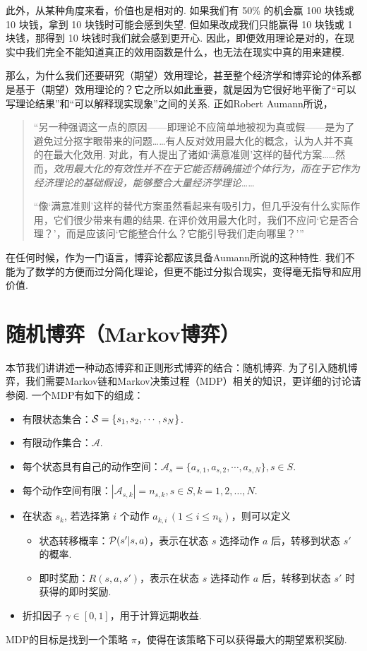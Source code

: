 此外，从某种角度来看，价值也是相对的. 如果我们有 50\% 的机会赢 100 块钱或 10 块钱，拿到 10 块钱时可能会感到失望. 但如果改成我们只能赢得 10 块钱或 1 块钱，那得到 10 块钱时我们就会感到更开心. 因此，即便效用理论是对的，在现实中我们完全不能知道真正的效用函数是什么，也无法在现实中真的用来建模.

那么，为什么我们还要研究（期望）效用理论，甚至整个经济学和博弈论的体系都是基于（期望）效用理论的？它之所以如此重要，就是因为它很好地平衡了“可以写理论结果”和“可以解释现实现象”之间的关系. 正如Robert Aumann所说，

\begin{quotation}
    “另一种强调这一点的原因——即理论不应简单地被视为真或假——是为了避免过分抠字眼带来的问题……有人反对效用最大化的概念，认为人并不真的在最大化效用. 对此，有人提出了诸如‘满意准则’这样的替代方案……然而，\textit{效用最大化的有效性并不在于它能否精确描述个体行为，而在于它作为经济理论的基础假设，能够整合大量经济学理论}……

    “像‘满意准则’这样的替代方案虽然看起来有吸引力，但几乎没有什么实际作用，它们很少带来有趣的结果. 在评价效用最大化时，我们不应问‘它是否合理？’，而是应该问‘它能整合什么？它能引导我们走向哪里？’”
\end{quotation}

在任何时候，作为一门语言，博弈论都应该具备Aumann所说的这种特性. 我们不能为了数学的方便而过分简化理论，但更不能过分拟合现实，变得毫无指导和应用价值.

\section{随机博弈（Markov博弈）}\label{sec:stochastic-game}

本节我们讲讲述一种动态博弈和正则形式博弈的结合：随机博弈. 为了引入随机博弈，我们需要Markov链和Markov决策过程（MDP）相关的知识，更详细的讨论请参阅. 一个MDP有如下的组成：
\begin{itemize}
\item 有限状态集合：$\mathcal S=\{s_1,s_2,\cdots,s_N\}$.
\item 有限动作集合：$\mathcal A$.
\item 每个状态具有自己的动作空间：$\mathcal A_s = \{a_{s,1},a_{s,2},\cdots, a_{s,N}\}, s\in S$.
\item 每个动作空间有限：$|\mathcal A_{s,k}|=n_{s,k}, s\in S, k=1,2,\dots,N$.
\item 在状态 $s_k$, 若选择第 $i$ 个动作 $a_{k,i}\,(1\leq i\leq n_{k})$，则可以定义
\begin{itemize}
        \item 状态转移概率：$\mathcal P(s'|s,a)$，表示在状态 $s$ 选择动作 $a$ 后，转移到状态 $s'$ 的概率. 
        \item 即时奖励：$R(s,a,s')$，表示在状态 $s$ 选择动作 $a$ 后，转移到状态 $s'$ 时获得的即时奖励. 
   \end{itemize}
\item 折扣因子 $\gamma\in[0,1]$，用于计算远期收益.
\end{itemize}
MDP的目标是找到一个策略 $\pi$，使得在该策略下可以获得最大的期望累积奖励. 

